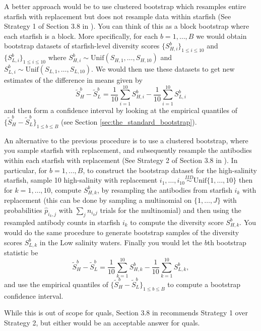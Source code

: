 \begin{enumerate}
A better approach would be to use clustered bootstrap which resamples entire starfish with replacement but does not resample data within starfish (See Strategy 1 of Section 3.8 in \cite{davison_hinkley_1997}). You can think of this as a block bootstrap where each starfish is a block.  More specifically, for each $b=1,\dots,B$ we would obtain bootstrap datasets of starfish-level diversity scores $\{ S_{H,i}^b\}_{1 \leq i \leq 10}$ and $\{ S_{L,i}^b\}_{1 \leq i \leq 10}$ where $ S_{H,i}^b \sim \text{Unif}( S_{H,1},\dots, S_{H,10})$ and $ S_{L,i}^b \sim \text{Unif}( S_{L,1},\dots, S_{L,10})$. We would then use these datasets to get new estimates of the difference in means given by $$\tilde{S}_H^b - \tilde{S}_L^b = \frac{1}{10} \sum_{i=1}^{10} S_{H,i}^b -  \frac{1}{10} \sum_{i=1}^{10} S_{L,i}^b$$ and then form a confidence interval by looking at the empirical quantiles of $\{\tilde{S}^b_H - \tilde{S}^b_L\}_{1 \leq b \leq B}$ (see Section \ref{sec:the_standard_bootstrap}).

An alternative to the previous procedure is to use a clustered bootstrap, where you sample starfish with replacement, and subsequently resample the antibodies within each starfish with replacement (See Strategy 2 of Section 3.8 in \cite{davison_hinkley_1997}). In particular, for $b=1,\dots, B$, to construct the bootstrap dataset for the high-salinity starfish, sample 10 high-salinity with replacement $i_1,\dots,i_{10}  \stackrel{IID}{\sim} \text{Unif} \{1,\dots,10 \}$ then for $k=1, \dots,10$, compute $S_{H,k}^b$, by resampling the antibodies from starfish $i_k$ with replacement (this can be done by sampling a multinomial on $\{1 , \dots ,J \}$ with probabilities $\hat{p}_{i_k,j}$ with $\sum_{j} n_{i_k j}$ trials for the multinomial) and then using the resampled antibody counts in starfish $i_k$ to compute the diversity score $S_{H,k}^b$. You would do the same procedure to generate bootstrap samples of the diversity scores $S_{L,k}^b$  in the Low salinity waters. Finally you would let the $b$th bootstrap statistic be  $$\tilde{S}_H^b - \tilde{S}_L^b=\frac{1}{10} \sum_{k=1}^{10} S_{H,k}^b -  \frac{1}{10} \sum_{k=1}^{10} S_{L,k}^b,$$ and use the empirical quantiles of $\{\tilde{S}^b_H - \tilde{S}^b_L\}_{1 \leq b \leq B}$ to compute a bootstrap confidence interval.

While this is out of scope for quals, Section 3.8 in \cite{davison_hinkley_1997} recommends Strategy 1 over Strategy 2, but either would be an acceptable answer for quals.






\end{enumerate}


